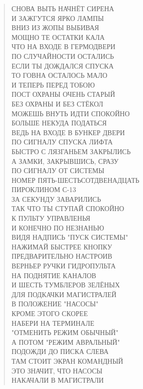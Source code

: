 \begin{verse}
СНОВА ВЫТЬ НАЧНЁТ СИРЕНА\\
И ЗАЖГУТСЯ ЯРКО ЛАМПЫ\\
ВНИЗ ИЗ ЖОПЫ ВЫБИВАЯ\\
МОЩНО ТЕ ОСТАТКИ КАЛА\\
ЧТО НА ВХОДЕ В ГЕРМОДВЕРИ\\
ПО СЛУЧАЙНОСТИ ОСТАЛИСЬ\\
ЕСЛИ ТЫ ДОЖДАЛСЯ СПУСКА\\
ТО ГОВНА ОСТАЛОСЬ МАЛО\\
И ТЕПЕРЬ ПЕРЕД ТОБОЮ\\
ПОСТ ОХРАНЫ ОЧЕНЬ СТАРЫЙ\\
БЕЗ ОХРАНЫ И БЕЗ СТЁКОЛ\\
МОЖЕШЬ ВНУТЬ ИДТИ СПОКОЙНО\\
БОЛЬШЕ НЕКУДА ПОДАТЬСЯ\\
ВЕДЬ НА ВХОДЕ В БУНКЕР ДВЕРИ\\
ПО СИГНАЛУ СПУСКА ЛИФТА\\
БЫСТРО С ЛЯЗГАНЬЕМ ЗАКРЫЛИСЬ\\
А ЗАМКИ, ЗАКРЫВШИСЬ, СРАЗУ\\
ПО СИГНАЛУ ОТ СИСТЕМЫ\\
НОМЕР ПЯТЬ-ШЕСТЬСОТДВЕНАДЦАТЬ\\
ПИРОКЛИНОМ С-13 \\
ЗА СЕКУНДУ ЗАВАРИЛИСЬ\\
ТАК ЧТО ТЫ СТУПАЙ СПОКОЙНО\\
К ПУЛЬТУ УПРАВЛЕНЬЯ\\
И КОНЕЧНО ПО НЕЗНАНЬЮ\\
ВИДЯ НАДПИСЬ "ПУСК СИСТЕМЫ"\\
НАЖИМАЙ БЫСТРЕЕ КНОПКУ\\
ПРЕДВАРИТЕЛЬНО НАСТРОИВ\\
ВЕРНЬЕР РУЧКИ ГИДРОПУЛЬТА\\
НА ПОДНЯТИЕ КАНАЛОВ\\
И ШЕСТЬ ТУМБЛЕРОВ ЗЕЛЁНЫХ\\
ДЛЯ ПОДКАЧКИ МАГИСТРАЛЕЙ\\
В ПОЛОЖЕНИЕ "НАСОСЫ"\\
КРОМЕ ЭТОГО СКОРЕЕ \\
НАБЕРИ НА ТЕРМИНАЛЕ\\
"ОТМЕНИТЬ РЕЖИМ ОБЫЧНЫЙ"\\
А ПОТОМ "РЕЖИМ АВРАЛЬНЫЙ"\\
ПОДОЖДИ ДО ПИСКА СЛЕВА\\
ТАМ СТОИТ ЭКРАН КОМАНДНЫЙ\\
ЭТО ЗНАЧИТ, ЧТО  НАСОСЫ\\
НАКАЧАЛИ В МАГИСТРАЛИ\\

\end{verse}

